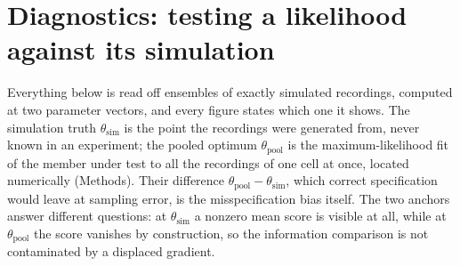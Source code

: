 \section*{Diagnostics: testing a likelihood against its simulation}

Everything below is read off ensembles of exactly simulated recordings, computed at two parameter vectors, and every figure states which one it shows. The simulation truth $\theta_{\mathrm{sim}}$ is the point the recordings were generated from, never known in an experiment; the pooled optimum $\theta_{\mathrm{pool}}$ is the maximum-likelihood fit of the member under test to all the recordings of one cell at once, located numerically (Methods). Their difference $\theta_{\mathrm{pool}}-\theta_{\mathrm{sim}}$, which correct specification would leave at sampling error, is the misspecification bias itself. The two anchors answer different questions: at $\theta_{\mathrm{sim}}$ a nonzero mean score is visible at all, while at $\theta_{\mathrm{pool}}$ the score vanishes by construction, so the information comparison is not contaminated by a displaced gradient. %

